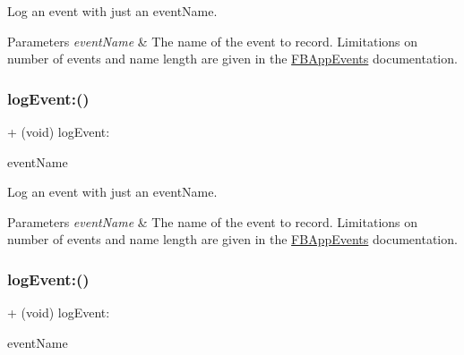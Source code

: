 Log an event with just an event\+Name.


\begin{DoxyParams}{Parameters}
{\em event\+Name} & The name of the event to record. Limitations on number of events and name length are given in the {\ttfamily \hyperlink{interfaceFBAppEvents}{F\+B\+App\+Events}} documentation. \\
\hline
\end{DoxyParams}
\mbox{\label{interfaceFBAppEvents_a816373dd50bcf7381bf8194758ef8441}} 
\subsubsection{\texorpdfstring{log\+Event\+:()}{logEvent:()}\hspace{0.1cm}{\footnotesize\ttfamily [3/5]}}
{\footnotesize\ttfamily + (void) log\+Event\+: \begin{DoxyParamCaption}\item[{(N\+S\+String $\ast$)}]{event\+Name }\end{DoxyParamCaption}}

Log an event with just an event\+Name.


\begin{DoxyParams}{Parameters}
{\em event\+Name} & The name of the event to record. Limitations on number of events and name length are given in the {\ttfamily \hyperlink{interfaceFBAppEvents}{F\+B\+App\+Events}} documentation. \\
\hline
\end{DoxyParams}
\mbox{\label{interfaceFBAppEvents_a816373dd50bcf7381bf8194758ef8441}} 
\subsubsection{\texorpdfstring{log\+Event\+:()}{logEvent:()}\hspace{0.1cm}{\footnotesize\ttfamily [4/5]}}
{\footnotesize\ttfamily + (void) log\+Event\+: \begin{DoxyParamCaption}\item[{(N\+S\+String $\ast$)}]{event\+Name }\end{DoxyParamCaption}}

